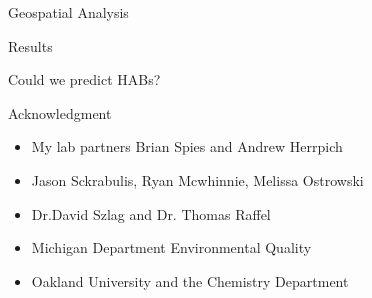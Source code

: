 \begin{frame}{Geospatial Analysis}

\end{frame}
\begin{frame}{Results}

\end{frame}
\begin{frame}{Could we predict HABs?}

\end{frame}

\begin{frame}{Acknowledgment}

	\begin{itemize}
		\item My lab partners Brian Spies and Andrew Herrpich
		\item Jason Sckrabulis, Ryan Mcwhinnie, Melissa Ostrowski
		\item Dr.David Szlag and Dr. Thomas Raffel
		\item Michigan Department Environmental Quality
		\item Oakland University and the Chemistry Department
	\end{itemize}

\end{frame}
